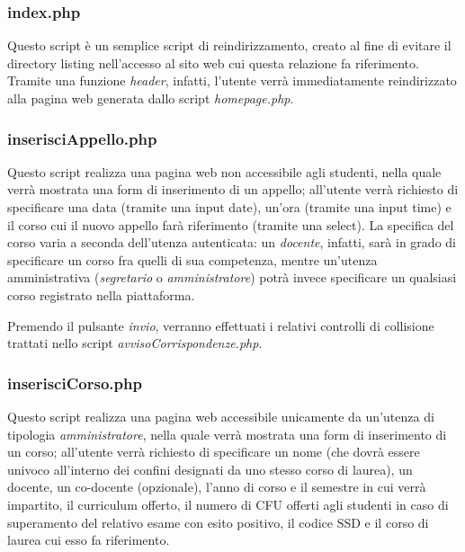 \documentclass [a4paper,11pt]{book}
\begin{document}
\medskip

\subsubsection{index.php}

Questo script è un semplice script di reindirizzamento, creato al fine di evitare il directory listing nell'accesso al sito web cui questa relazione fa riferimento. Tramite una funzione \emph{header}, infatti, l'utente verrà immediatamente reindirizzato alla pagina web generata dallo script \emph{homepage.php}.

\medskip

\subsubsection{inserisciAppello.php}

Questo script realizza una pagina web non accessibile agli studenti, nella quale verrà mostrata una form di inserimento di un appello; all'utente verrà richiesto di specificare una data (tramite una input date), un'ora (tramite una input time) e il corso cui il nuovo appello farà riferimento (tramite una select). La specifica del corso varia a seconda dell'utenza autenticata: un \emph{docente}, infatti, sarà in grado di specificare un corso fra quelli di sua competenza, mentre un'utenza amministrativa (\emph{segretario} o \emph{amministratore}) potrà invece specificare un qualsiasi corso registrato nella piattaforma.

Premendo il pulsante \emph{invio}, verranno effettuati i relativi controlli di collisione trattati nello script \emph{avvisoCorrispondenze.php}.

\medskip

\subsubsection{inserisciCorso.php}

Questo script realizza una pagina web accessibile unicamente da un'utenza di tipologia \emph{amministratore}, nella quale verrà mostrata una form di inserimento di un corso; all'utente verrà richiesto di specificare un nome (che dovrà essere univoco all'interno dei confini designati da uno stesso corso di laurea), un docente, un co-docente (opzionale), l'anno di corso e il semestre in cui verrà impartito, il curriculum offerto, il numero di CFU offerti agli studenti in caso di superamento del relativo esame con esito positivo, il codice SSD e il corso di laurea cui esso fa riferimento.
\end{document}

